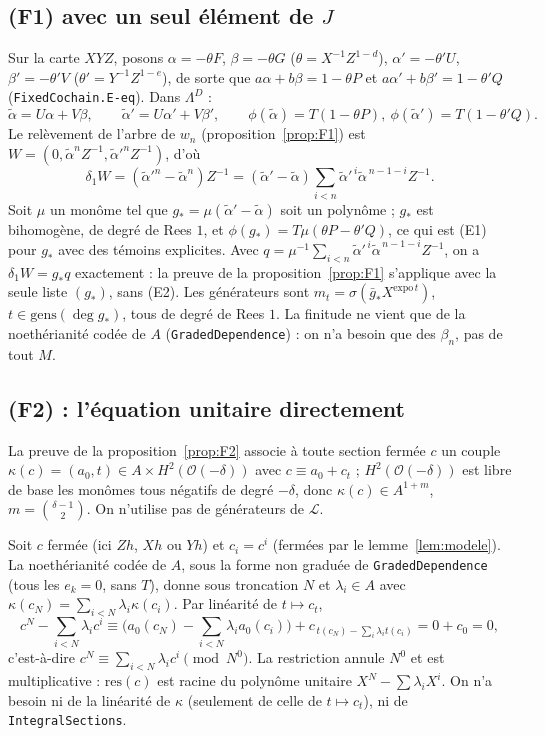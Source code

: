 \documentclass[11pt]{amsart}
\theoremstyle{remark}
\newcommand{\La}{\Lambda}
\begin{document}
\subsection*{(F1) avec un seul élément de $J$}
Sur la carte $XYZ$, posons $\alpha=-\theta F$, $\beta=-\theta G$
($\theta=X^{-1}Z^{1-d}$), $\alpha'=-\theta'U$, $\beta'=-\theta'V$
($\theta'=Y^{-1}Z^{1-e}$), de sorte que $a\alpha+b\beta=1-\theta P$ et
$a\alpha'+b\beta'=1-\theta'Q$ (\texttt{FixedCochain.E-eq}). Dans $\La^D$ :
\[
 \tilde\alpha=U\alpha+V\beta,\qquad \tilde\alpha'=U\alpha'+V\beta' ,
 \qquad \phi(\tilde\alpha)=T(1-\theta P),\ \phi(\tilde\alpha')=T(1-\theta'Q).
\]
Le relèvement de l'arbre de $w_n$ (proposition~\ref{prop:F1}) est
$W=(0,\tilde\alpha^nZ^{-1},\tilde\alpha'^nZ^{-1})$, d'où
\[
 \delta_1W=(\tilde\alpha'^n-\tilde\alpha^n)Z^{-1}
 =(\tilde\alpha'-\tilde\alpha)\sum_{i<n}\tilde\alpha'^{\,i}\tilde\alpha^{\,n-1-i}Z^{-1}.
\]
Soit $\mu$ un monôme tel que $g_*=\mu(\tilde\alpha'-\tilde\alpha)$ soit un
polynôme ; $g_*$ est bihomogène, de degré de Rees $1$, et
$\phi(g_*)=T\mu(\theta P-\theta'Q)$, ce qui est (E1) pour $g_*$ avec des
témoins explicites. Avec $q=\mu^{-1}\sum_{i<n}\tilde\alpha'^{\,i}
\tilde\alpha^{\,n-1-i}Z^{-1}$, on a $\delta_1W=g_*q$ exactement : la
preuve de la proposition~\ref{prop:F1} s'applique avec la seule liste
$(g_*)$, sans (E2). Les générateurs sont
$m_t=\sigma(\bar g_*X^{\mathrm{expo}\,t})$, $t\in\mathrm{gens}(\deg g_*)$,
tous de degré de Rees $1$. La finitude ne vient que de la noethérianité
codée de $A$ (\texttt{GradedDependence}) : on n'a besoin que des $\beta_n$,
pas de tout $M$.

\subsection*{(F2) : l'équation unitaire directement}
La preuve de la proposition~\ref{prop:F2} associe à toute section fermée
$c$ un couple $\kappa(c)=(a_0,t)\in A\times H^2(\mathcal O(-\delta))$ avec
$c\equiv a_0+c_t$ ; $H^2(\mathcal O(-\delta))$ est libre de base les
monômes tous négatifs de degré $-\delta$, donc
$\kappa(c)\in A^{1+m}$, $m=\binom{\delta-1}{2}$. On n'utilise pas de
générateurs de $\mathcal L$.

Soit $c$ fermée (ici $Zh$, $Xh$ ou $Yh$) et $c_i=c^i$ (fermées par le
lemme~\ref{lem:modele}). La noethérianité codée de $A$, sous la forme non
graduée de \texttt{GradedDependence} (tous les $e_k=0$, sans $T$), donne
sous troncation $N$ et $\lambda_i\in A$ avec
$\kappa(c_N)=\sum_{i<N}\lambda_i\kappa(c_i)$. Par linéarité de
$t\mapsto c_t$,
\[
 c^N-\sum_{i<N}\lambda_ic^i\equiv\Big(a_0(c_N)-\sum_{i<N}\lambda_ia_0(c_i)\Big)
   +c_{\,t(c_N)-\sum_i\lambda_it(c_i)}=0+c_0=0 ,
\]
c'est-à-dire $c^N\equiv\sum_{i<N}\lambda_ic^i\pmod{N^0}$. La restriction
annule $N^0$ et est multiplicative : $\mathrm{res}(c)$ est racine du
polynôme unitaire $X^N-\sum\lambda_iX^i$. On n'a besoin ni de la linéarité
de $\kappa$ (seulement de celle de $t\mapsto c_t$), ni de
\texttt{IntegralSections}.
\end{document}

